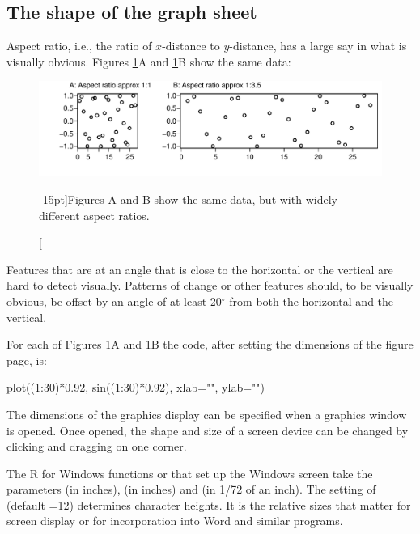\subsection{The shape of the graph sheet}
Aspect ratio, i.e., the ratio of $x$-distance to $y$-distance, has a
large say in what is visually obvious.  Figures \ref{fig:aspect}A and
\ref{fig:aspect}B show the same data:
\begin{figure}
\begin{Schunk}


\centerline{\includegraphics[width=\textwidth]{figs/07-fig8_3e-1} }

\end{Schunk}
\caption[][-15pt]{Figures A and B show the same data, but with widely different
  aspect ratios.\label{fig:aspect}}
\end{figure}
\noindent
Features that are at an angle that is close to the horizontal or the
vertical are hard to detect visually. Patterns of change or other
features should, to be visually obvious, be offset by an angle of
at least 20$^\circ$ from both the horizontal and the vertical.

\noindent For each of Figures \ref{fig:aspect}A and \ref{fig:aspect}B
the code, after setting the dimensions of the figure page, is:
\begin{Schunk}
\begin{Sinput}
plot((1:30)*0.92, sin((1:30)*0.92),
     xlab="", ylab="")
\end{Sinput}
\end{Schunk}

The dimensions of the graphics display can be specified when a
graphics window is opened.  Once opened, the shape and size of a
screen device can be changed by clicking and dragging on one corner.

The R for Windows functions  or  that
set up the Windows screen take the parameters  (in
inches),  (in inches) and  (in 1/72 of an
inch). The setting of  (default =12) determines
character heights. It is the relative sizes that matter for screen
display or for incorporation into Word and similar programs.

